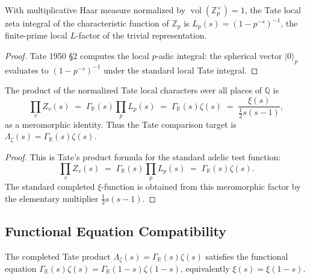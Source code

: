 \begin{proposition}[finite-prime Tate character \(= L_{p}(s)\)]
\label{v4-arith:lacd:prop:finite-character}
With multiplicative Haar measure normalized by
\(\operatorname{vol}(\mathbb Z_p^\times)=1\), the Tate local zeta
integral of the characteristic function of \(\mathbb Z_p\) is
\(L_{p}(s) = (1 - p^{-s})^{-1}\), the finite-prime local \(L\)-factor
of the trivial representation.
\end{proposition}

\begin{proof}
Tate 1950 \S2 computes the local \(p\)-adic integral: the spherical
vector \(|0\rangle_{p}\) evaluates to \((1 - p^{-s})^{-1}\) under the
standard local Tate integral.
\end{proof}

\begin{theorem}
\label{v4-arith:lacd:thm:xi-reproduced}
The product of the normalized Tate local
characters over all places of \(\mathbb Q\) is
\begin{equation}
\prod_v Z_v(s)
\;=\; \Gamma_{\mathbb{R}}(s)\prod_{p}L_{p}(s)
\;=\; \Gamma_{\mathbb{R}}(s)\zeta(s)
\;=\; \frac{\xi(s)}{\tfrac{1}{2}s(s-1)},
\end{equation}
as a meromorphic identity. Thus the Tate comparison target is
\(\Lambda_{\zeta}(s)=\Gamma_{\mathbb{R}}(s)\zeta(s)\).
\end{theorem}

\begin{proof}
This is Tate's product formula for the standard adelic test function:
\begin{equation}
\prod_v Z_v(s)
\;=\;\Gamma_{\mathbb{R}}(s)\prod_{p}L_{p}(s)
\;=\;\Gamma_{\mathbb{R}}(s)\zeta(s).
\end{equation}
The standard completed \(\xi\)-function is obtained from this
meromorphic factor by the elementary multiplier \(\tfrac12 s(s-1)\).
\end{proof}

\subsection{Functional Equation Compatibility}

\begin{corollary}
\label{v4-arith:lacd:cor:fe-preserved}
The completed Tate product
\(\Lambda_{\zeta}(s)=\Gamma_{\mathbb{R}}(s)\zeta(s)\) satisfies the
functional equation
\(\Gamma_{\mathbb{R}}(s)\zeta(s) = \Gamma_{\mathbb{R}}(1-s)\zeta(1-s)\),
equivalently \(\xi(s) = \xi(1-s)\).
\end{corollary}

